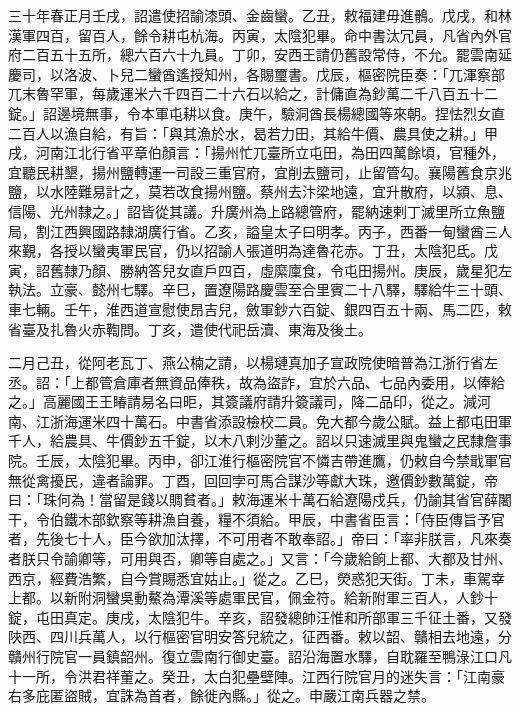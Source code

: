 \begin{pinyinscope}
 三十年春正月壬戌，詔遣使招諭漆頭、金齒蠻。乙丑，敕福建毋進鶻。戊戌，和林漢軍四百，留百人，餘令耕屯杭海。丙寅，太陰犯畢。命中書汰冗員，凡省內外官府二百五十五所，總六百六十九員。丁卯，安西王請仍舊設常侍，不允。罷雲南延慶司，以洛波、卜兒二蠻酋遙授知州，各賜璽書。戊辰，樞密院臣奏：「兀渾察部兀末魯罕軍，每歲運米六千四百二十六石以給之，計傭直為鈔萬二千八百五十二錠。」詔邊境無事，令本軍屯耕以食。庚午，驗洞酋長楊總國等來朝。捏怯烈女直二百人以漁自給，有旨：「與其漁於水，曷若力田，其給牛價、農具使之耕。」甲戌，河南江北行省平章伯顏言：「揚州忙兀臺所立屯田，為田四萬餘頃，官種外，宜聽民耕墾，揚州鹽轉運一司設三重官府，宜削去鹽司，止留管勾。襄陽舊食京兆鹽，以水陸難易計之，莫若改食揚州鹽。蔡州去汴梁地遠，宜升散府，以潁、息、信陽、光州隸之。」詔皆從其議。升廣州為上路總管府，罷納速剌丁滅里所立魚鹽局，割江西興國路隸湖廣行省。乙亥，謚皇太子曰明孝。丙子，西番一甸蠻酋三人來覲，各授以蠻夷軍民官，仍以招諭人張道明為達魯花赤。丁丑，太陰犯氐。戊寅，詔舊隸乃顏、勝納答兒女直戶四百，虛縻廩食，令屯田揚州。庚辰，歲星犯左執法。立豪、懿州七驛。辛巳，置遼陽路慶雲至合里賓二十八驛，驛給牛三十頭、車七輛。壬午，淮西道宣慰使昂吉兒，斂軍鈔六百錠、銀四百五十兩、馬二匹，敕省臺及扎魯火赤鞫問。丁亥，遣使代祀岳瀆、東海及後土。



 二月己丑，從阿老瓦丁、燕公楠之請，以楊璉真加子宣政院使暗普為江浙行省左丞。詔：「上都管倉庫者無資品俸秩，故為盜詐，宜於六品、七品內委用，以俸給之。」高麗國王王睶請易名曰昛，其簽議府請升簽議司，降二品印，從之。減河南、江浙海運米四十萬石。中書省添設檢校二員。免大都今歲公賦。益上都屯田軍千人，給農具、牛價鈔五千錠，以木八剌沙董之。詔以只速滅里與鬼蠻之民隸詹事院。壬辰，太陰犯畢。丙申，卻江淮行樞密院官不憐吉帶進鷹，仍敕自今禁戢軍官無從禽擾民，違者論罪。丁酉，回回孛可馬合謀沙等獻大珠，邀價鈔數萬錠，帝曰：「珠何為！當留是錢以賙貧者。」敕海運米十萬石給遼陽戍兵，仍諭其省官薛闍干，令伯鐵木部欽察等耕漁自養，糧不須給。甲辰，中書省臣言：「侍臣傳旨予官者，先後七十人，臣今欲加汰擇，不可用者不敢奉詔。」帝曰：「率非朕言，凡來奏者朕只令諭卿等，可用與否，卿等自處之。」又言：「今歲給餉上都、大都及甘州、西京，經費浩繁，自今賞賜悉宜姑止。」從之。乙巳，熒惑犯天街。丁未，車駕幸上都。以新附洞蠻吳動鰲為潭溪等處軍民官，佩金符。給新附軍三百人，人鈔十錠，屯田真定。庚戌，太陰犯牛。辛亥，詔發總帥汪惟和所部軍三千征土番，又發陜西、四川兵萬人，以行樞密官明安答兒統之，征西番。敕以韶、贛相去地遠，分贛州行院官一員鎮韶州。復立雲南行御史臺。詔沿海置水驛，自耽羅至鴨淥江口凡十一所，令洪君祥董之。癸丑，太白犯壘壁陣。江西行院官月的迷失言：「江南豪右多庇匿盜賊，宜誅為首者，餘徙內縣。」從之。申嚴江南兵器之禁。




\end{pinyinscope}
